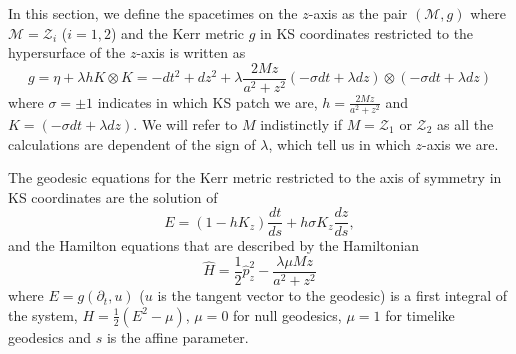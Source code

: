 In this section, we define the spacetimes on the $z$-axis as the pair $(\mathcal{M},g)$ where $\mathcal{M}=\mathcal{Z}_i$ ($i={1,2}$) and the Kerr metric $g$ in \gls{KS} coordinates restricted to the hypersurface of the $z$-axis is written as
\begin{equation}\label{eq:KSmetricaxis}
 g=\eta + \lambda h K \otimes K =-dt^2+dz^2+\lambda \frac{2 M  z}{a^2+z^2} (-\sigma dt +\lambda dz) \otimes  (-\sigma dt +\lambda dz)
\end{equation}
where $\sigma=\pm 1$ indicates in which \gls{KS} patch we are, $h=\frac{2 M   z}{a^2+z^2}$ and $K=(-\sigma dt +\lambda dz)$. We will refer to $M$ indistinctly if $M=\mathcal{Z}_1$ or $\mathcal{Z}_2$ as all the calculations are dependent of the sign of $\lambda$, which tell us in which $z$-axis we are.

\begin{theorem}\label{Hamiltonianequivalence}
 The geodesic equations for the Kerr metric restricted to the axis of symmetry in \gls{KS} coordinates are the solution of
 \begin{equation}\label{E}
 E= \left (  1 -  h K_z  \right ) \frac{d t}{ds}
+ h \sigma K_z \frac{d z}{ds},
 \end{equation}
 and the Hamilton equations that are described by the Hamiltonian
 \begin{equation}
  \hat{H}=\frac{1}{2} \hat{p}_z^2 -\frac{ \lambda  \mu  M z}{a^2+z^2}
 \end{equation}
where $E=g(\partial_t,u)$ ($u$ is the tangent vector to the geodesic) is a first integral of the system, $H=\frac{1}{2}(E^2-\mu)$, $\mu=0$ for null geodesics, $\mu=1$ for timelike geodesics and $s$ is the affine parameter.
\end{theorem}
